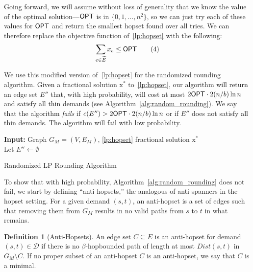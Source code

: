 \documentclass{article}
\theoremstyle{definition}
\newtheorem{definition}{Definition}
\theoremstyle{remark}
\def\opt {{\sf OPT}}
\begin{document}
Going forward, we will assume without loss of generality that we know the value of the optimal solution---${\opt}$ is in $\{0, 1, \dots, n^2 \}$, so we can just try each of these values for ${\opt}$ and return the smallest hopset found over all tries. We can therefore replace the objective function of~\ref{lp:hopset} with the following:
\begin{align*}
    \sum_{e \in \widetilde{E}} x_e \leq {\opt} \tag{4}
\end{align*}

We use this modified version of~\ref{lp:hopset} for the randomized rounding algorithm. Given a fractional solution $\bm{\mathrm{x}}^*$ to~\ref{lp:hopset}, our algorithm will return an edge set $E''$ that, with high probability, will cost at most $2{\opt} \cdot 2(n/b)  \ln{n}$ and satisfy all thin demands (see Algorithm~\ref{alg:random_rounding}). We say that the algorithm \textit{fails} if $c(E'') > 2{\opt} \cdot 2(n/b)  \ln{n}$ or if $E''$ does not satisfy all thin demands. The algorithm will fail with low probability.

\begin{algorithm}[h]
\DontPrintSemicolon

\textbf{Input:} Graph $G_M = (V, E_M)$, \ref{lp:hopset} fractional solution $\bm{\mathrm{x}}^*$ \\

Let $E'' \gets \emptyset$ \; \;

 \;

    

\caption{\label{alg:random_rounding} Randomized LP Rounding Algorithm }
\end{algorithm}

To show that with high probability, Algorithm~\ref{alg:random_rounding} does not fail, we start by defining ``anti-hopsets,'' the analogous of anti-spanners in the hopset setting. For a given demand $(s,t)$, an anti-hopset is a set of edges such that removing them from $G_M$ results in no valid paths from $s$ to $t$ in what remains.

\begin{definition}[Anti-Hopsets]
    An edge set $C \subseteq E$ is an anti-hopset for demand $(s,t) \in \mathcal{D}$ if there is no $\beta$-hopbounded path of length at most $Dist(s,t)$ in $G_M \setminus C$. If no proper subset of an anti-hopset $C$ is an anti-hopset, we say that $C$ is a minimal.
\end{definition}
\end{document}
